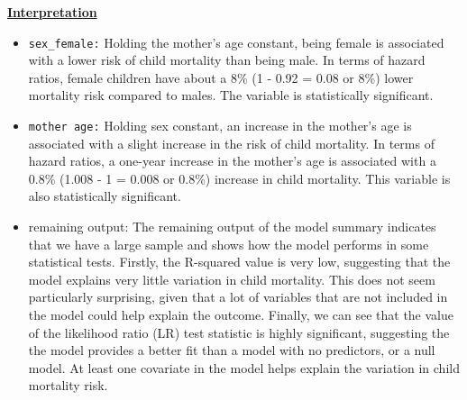 \documentclass[12pt,letterpaper]{article}
\begin{document}
 \underline{\textbf{Interpretation}}
 \begin{itemize}
 	\item \texttt{sex\_female:} Holding the mother’s age constant, being female is associated with a lower risk of child mortality than being male. In terms of hazard ratios, female children have about a 8\% (1 - 0.92 = 0.08 or 8\%) lower mortality risk compared to males. The variable is statistically significant. 
 	\newpage
 	\item  \texttt{mother age:} Holding sex constant, an increase in the mother’s age is associated with a slight increase in the risk of child mortality. In terms of hazard ratios, a one-year increase in the mother’s age is associated with a 0.8\% (1.008 - 1 = 0.008 or  0.8\%) increase in child mortality. This variable is also statistically significant.
 	\item remaining output: The remaining output of the model summary indicates that we have a large sample and shows how the model performs in some statistical tests. Firstly, the R-squared value is very low, suggesting that the model explains very little variation in child mortality. This does not seem particularly surprising, given that a lot of variables that are not included in the model could help explain the outcome. Finally, we can see that the value of the  likelihood ratio (LR) test statistic is highly significant, suggesting the the model provides a better fit than a model with no predictors, or a null model. At least one covariate in the model helps explain the variation in child mortality risk. 
 \end{itemize}
\newpage
\end{document}
